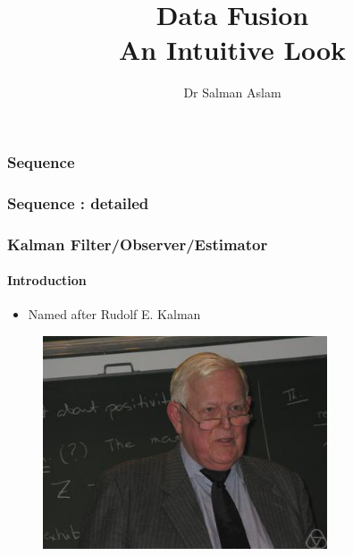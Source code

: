 

\title{Data Fusion\\
An Intuitive Look}  
\author{Dr Salman Aslam}
\date{} 




\begin{frame}[plain]\pw\Large
\vspace{0.8in}
\titlepage
\end{frame}

\begin{frame}[plain]\pw\Large
\frametitle{\textbf{Sequence}}
\setcounter{tocdepth}{1}
\tableofcontents
\end{frame} 

\begin{frame}[plain]\pw\Large
\frametitle{\textbf{Sequence : detailed}}
\setcounter{tocdepth}{2}
\tableofcontents%
\end{frame} 






\begin{frame}\pw\Large
\frametitle{Kalman Filter/Observer/Estimator}
\framesubtitle{Introduction}

\scriptsize
\begin{itemize}
\item Named after Rudolf E. Kalman
\end{itemize}
\begin{figure}[h]
\centering
\includegraphics[width=0.75\textwidth]{figs/CONTROLS_portrait_RudolfKalman.jpg}
\end{figure}
\end{frame}


